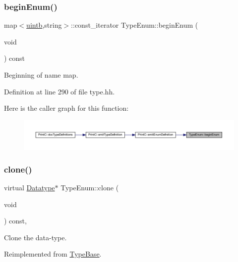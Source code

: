 \subsubsection{\texorpdfstring{beginEnum()}{beginEnum()}}
{\footnotesize\ttfamily map$<$\mbox{\hyperlink{types_8h_a2db313c5d32a12b01d26ac9b3bca178f}{uintb}},string$>$\+::const\+\_\+iterator Type\+Enum\+::begin\+Enum (\begin{DoxyParamCaption}\item[{void}]{ }\end{DoxyParamCaption}) const\hspace{0.3cm}{\ttfamily [inline]}}



Beginning of name map. 



Definition at line 290 of file type.\+hh.

Here is the caller graph for this function\+:
\nopagebreak
\begin{figure}[H]
\begin{center}
\leavevmode
\includegraphics[width=350pt]{class_type_enum_afd8ca15a5bda006a1d65737b1e3109e1_icgraph}
\end{center}
\end{figure}
\mbox{\label{class_type_enum_ac5592c52de3d1ccad25cd9e1e20126d7}} 
\subsubsection{\texorpdfstring{clone()}{clone()}}
{\footnotesize\ttfamily virtual \mbox{\hyperlink{class_datatype}{Datatype}}$\ast$ Type\+Enum\+::clone (\begin{DoxyParamCaption}\item[{void}]{ }\end{DoxyParamCaption}) const\hspace{0.3cm}{\ttfamily [inline]}, {\ttfamily [virtual]}}



Clone the data-\/type. 



Reimplemented from \mbox{\hyperlink{class_type_base_ad506116cf9bf5bc6d13654b38609d184}{Type\+Base}}.



